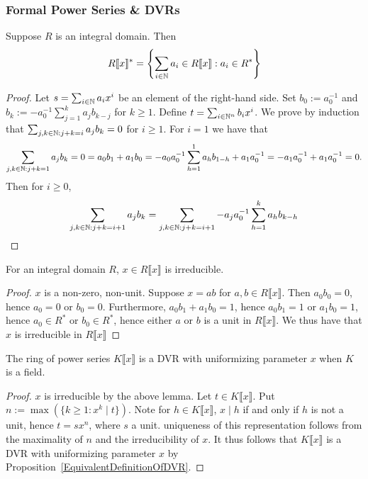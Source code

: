 \subsubsection{Formal Power Series \& DVRs}
\begin{lemma}
    Suppose $R$ is an integral domain. Then $$R\llbracket x \rrbracket ^\ast=  \left\{\sum_{i\in \mathbb{N}} a_i\in R\llbracket x\rrbracket : a_i \in R^\ast \right\}$$
\end{lemma}
\begin{proof}
    Let $s = \sum_{i\in\mathbb{N}}a_ix^i$  be an element of the right-hand side. Set $b_0 := a_0^{-1}$ and $b_k := -a_0^{-1}\sum_{j=1}^{k} a_jb_{k-j}$ for $k\geq 1$. Define $t =  \sum_{i\in \mathbb{N}^n} b_ix^i$. We prove by induction that $\sum_{j,k\in\mathbb{N} : j+k=i} a_jb_k=0$ for $i\geq 1$. For $i=1$ we have that 
    $$\sum_{j,k\in\mathbb{N} : j+k=1} a_jb_k=0 = a_0b_1+a_1b_0 = -a_0a_0^{-1}\sum_{h=1}^1 a_hb_{1-h}+a_1a_0^{-1} = -a_1a_0^{-1}+a_1a_0^{-1}=0.$$
    Then for $i\geq 0$,
    $$\sum_{j,k\in\mathbb{N} : j+k=i+1}a_jb_k = \sum_{j,k\in\mathbb{N} : j+k=i+1}-a_ja_0^{-1}\sum_{h=1}^ka_hb_{k-h}$$
\end{proof}
\begin{lemma}
    For an integral domain $R$, $x\in R\llbracket x \rrbracket$ is irreducible.  
\end{lemma}
\begin{proof}
    $x$ is a non-zero, non-unit. Suppose $x=ab$ for $a,b\in R\llbracket x\rrbracket$. Then $a_0b_0=0$, hence $a_0=0$ or $b_0 =0$. Furthermore, $a_0b_1+a_1b_0 = 1$, hence $a_0b_1=1$ or $a_1b_0 = 1$, hence $a_0\in R^\ast$ or $b_0\in R^\ast$, hence either $a$ or $b$ is a unit in $R\llbracket x\rrbracket$. We thus have that $x$ is irreducible in $R\llbracket x\rrbracket$    
\end{proof}
\begin{proposition}
    The ring of power series $K\llbracket x\rrbracket$ is a DVR with uniformizing parameter $x$ when $K$ is a field.
\end{proposition}
\begin{proof}
    $x$ is irreducible by the above lemma. Let $t\in K\llbracket x\rrbracket$. Put $n := \max (\{k\geq 1: x^k\mid t\}).$ Note for $h\in K\llbracket x\rrbracket$, $x\mid h $ if and only if $h$ is not a unit, hence $t = sx^n$, where $s$ a unit. uniqueness of this representation follows from the maximality of $n$ and the irreducibility of $x$. It thus follows that $K\llbracket x\rrbracket$ is a DVR with uniformizing parameter $x$ by Proposition~\ref{EquivalentDefinitionOfDVR}.
\end{proof}
